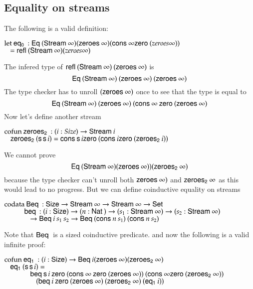 \subsection{Equality on streams}
The following is a valid definition:
\begin{bsp}
$\mathrm{let}\: \mathsf{eq_0}\: : \mathsf{Eq}\: (\mathsf{Stream}\: \infty) (\mathsf{zeroes}\: \infty) (\mathsf{cons}\: \infty \mathsf{zero}\: (zeroes \infty))$\\
$\hspace*{3mm} = \mathsf{refl}\: (\mathsf{Stream}\: \infty) (zeroes \infty)$
\end{bsp}
The infered type of $\mathsf{refl}\: (\mathsf{Stream}\: \infty) \: (\mathsf{zeroes}\: \infty)$ is 
\[\mathsf{Eq}\: (\mathsf{Stream}\: \infty) \: (\mathsf{zeroes}\: \infty) \: (\mathsf{zeroes}\: \infty)\]
The type checker has to unroll $(\mathsf{zeroes}\: \infty)$ once to see that the type is equal to 
\[
\mathsf{Eq}\: (\mathsf{Stream}\: \infty) \: (\mathsf{zeroes}\: \infty) \: (\mathsf{cons}\: \infty \: \mathsf{zero}\: (\mathsf{zeroes}\: \infty)
\]
Now let's define another stream
\begin{bsp}
$\mathrm{cofun}\: \mathsf{zeroes_2}\:: ( i : Size ) \rightarrow{\mathsf{Stream}\:i} $ \\
$\hspace*{3mm} \mathsf{zeroes_2}\: (\mathsf{s}\, \mathsf{s}\, i) = \mathsf{cons}\: \mathsf{s}\, i \mathsf{zero}\: (\mathsf{cons}\: i \mathsf{zero}\: (\mathsf{zeroes_2}\: i))$\\
\end{bsp}
We cannot prove \[\mathsf{Eq}\: (\mathsf{Stream}\: \infty) (\mathsf{zeroes}\: \infty)) (\mathsf{zeroes_2}\: \infty)\]
because the type checker can't unroll both $\mathsf{zeroes}\: \infty)$ and $\mathsf{zeroes_2}\: \infty$ as
this would lead to no progress.
But we can define coinductive equality  on streams \cite{coquand-infinite}
\begin{bsp}
$\mathrm{codata}\: \mathsf{Beq}\: : \mathsf{Size} \rightarrow \mathsf{Stream}\: \infty \rightarrow \mathsf{Stream}\: \infty \rightarrow \mathsf{Set}$\\
$ \spcx \beq : (i : \Size ) \ra ( n : \Nat ) \ra (s_1 : \Stream \infty ) \ra (s_2 : \Stream \infty )$\\
$ \spcx \spc  \ra \beqd i \: s_1 \: s_2 \ra \beqd (\cons n \: s_1) \: (\cons n \: s_2)$
\end{bsp}
Note that $\mathsf{Beq}\:$ is a sized coinductive predicate.
and now the following is a valid infinite proof:
\begin{bsp}
$\mathrm{cofun}\: \mathsf{eq_1}\: : (i : \mathsf{Size} ) \rightarrow \mathsf{Beq}\: i (\mathsf{zeroes}\: \infty) (\mathsf{zeroes_2}\: \infty)$\\
$\hspace*{3mm} \mathsf{eq_1}\: (\mathsf{s}\, \mathsf{s}\, i) = $\\
$\spc \spcx \beq \s i \: \zero (\cons \infty \: \zero (\zeroes \infty)) \: (\cons \infty \zero (\zeroest \infty))$\\ 
$\spc \spcx \spc (\beq i \: \zero (\zeroes \infty) \: (\zeroest \infty) \: (\eqt i))$
\end{bsp}

